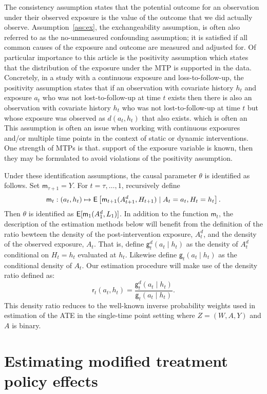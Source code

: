 \documentclass[]{jss}
\newcommand{\Q}{\mathsf{m}}
\renewcommand{\r}{\mathsf{r}}
\newcommand{\g}{\mathsf{g}}
\begin{document}
The consistency assumption states that the potential outcome for an
observation under their observed exposure is the value of the outcome
that we did actually observe. Assumption~\ref{ass:ex}, the
exchangeability assumption, is often also referred to as the
no-unmeasured confounding assumption; it is satisfied if all common
causes of the exposure and outcome are measured and adjusted for. Of
particular importance to this article is the positivity assumption
which states that the distribution of the exposure under the MTP is
supported in the data. Concretely, in a study with a continuous
exposure and loss-to-follow-up, the positivity assumption states that
if an observation with covariate history \(h_t\) and exposure \(a_t\)
who was not lost-to-follow-up at time \(t\) exists then there is also
an observation with covariate history \(h_t\) who was not
lost-to-follow-up at time \(t\) but whose exposure was observed as
\(d(a_t, h_t)\) that also exists. which is often an This assumption is
often an issue when working with continuous exposures and/or multiple
time points in the context of static or dynamic interventions. One
strength of MTPs is that.  support of the exposure variable is known,
then they may be formulated to avoid violations of the positivity
assumption.%

Under these identification assumptions, the causal parameter $\theta$
is identified as follows. Set $\Q_{\tau+1}= Y$. For $t=\tau,\ldots,1$,
recursively define
\begin{equation}
  \Q_t:(a_t, h_t) \mapsto \E\left[\Q_{t+1}(A_{t+1}^d, H_{t+1})\mid
    A_t=a_t, H_t=h_t\right].\label{eq:defQ}
\end{equation} Then $\theta$ is identified as
$\E[\Q_1(A_1^d, L_1)]$.
In addition to the function $\Q_t$, the description of the estimation
methods below will benefit from the definition of the ratio bewteen
the density of the post-intervention exposure, $A_t^d$, and the
density of the observed exposure, $A_t$. That is, define $\g_t^d(a_t\mid
h_t)$ as the density of $A_t^d$ conditional on $H_t=h_t$ evaluated at
$h_t$. Likewise define $\g_t(a_t\mid h_t)$ as the conditional density
of $A_t$. Our estimation procedure will make use of the density ratio
defined as:
\[\r_t(a_t, h_t) = \frac{\g_t^d(a_t\mid
    h_t)}{\g_t(a_t\mid h_t)}.\]
This density ratio reduces to the well-known inverse probability
weights used in estimation of the ATE in the single-time point setting
where $Z=(W,A,Y)$ and $A$ is binary.

\hypertarget{estimating-modified-treatment-policy-effects}{%
\section{Estimating modified treatment policy
effects}\label{estimating-modified-treatment-policy-effects}}
\end{document}

